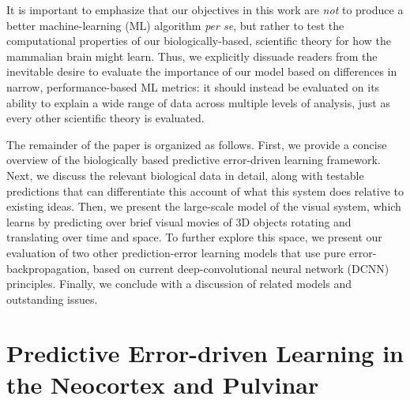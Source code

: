 \documentclass[11pt,twoside]{article}
\newif\myifpdf
\begin{document}
It is important to emphasize that our objectives in this work are \emph{not} to produce a better machine-learning (ML) algorithm \emph{per se}, but rather to test the computational properties of our biologically-based, scientific theory for how the mammalian brain might learn.  Thus, we explicitly dissuade readers from the inevitable desire to evaluate the importance of our model based on differences in narrow, performance-based ML metrics: it should instead be evaluated on its ability to explain a wide range of data across multiple levels of analysis, just as every other scientific theory is evaluated.

The remainder of the paper is organized as follows.  First, we provide a concise overview of the biologically based predictive error-driven learning framework.  Next, we discuss the relevant biological data in detail, along with testable predictions that can differentiate this account of what this system does relative to existing ideas.  Then, we present the large-scale model of the visual system, which learns by predicting over brief visual movies of 3D objects rotating and translating over time and space.  To further explore this space, we present our evaluation of two other prediction-error learning models that use pure error-backpropagation, based on current deep-convolutional neural network (DCNN) principles.  Finally, we conclude with a discussion of related models and outstanding issues.

\section{Predictive Error-driven Learning in the Neocortex and Pulvinar}
\end{document}

